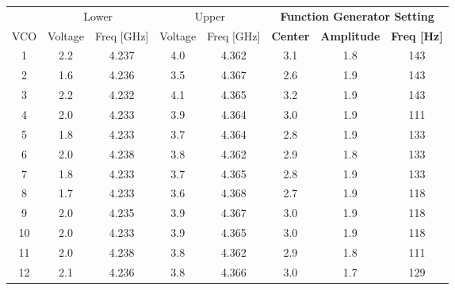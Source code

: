 \begin{table}[]
\centering
\begin{tabular}{@{}c|cc|cc|ccc@{}}
    & \multicolumn{2}{c|}{Lower} & \multicolumn{2}{c|}{Upper} & \multicolumn{3}{c}{\textbf{Function Generator Setting}}       \\
VCO & Voltage  & Freq {[}GHz{]}  & Voltage  & Freq {[}GHz{]}  & \textbf{Center} & \textbf{Amplitude} & \textbf{Freq {[}Hz{]}} \\ \midrule
1   & 2.2      & 4.237           & 4.0      & 4.362           & 3.1             & 1.8                & 143                    \\
2   & 1.6      & 4.236           & 3.5      & 4.367           & 2.6             & 1.9                & 143                    \\
3   & 2.2      & 4.232           & 4.1      & 4.365           & 3.2             & 1.9                & 143                    \\
4   & 2.0       & 4.233           & 3.9      & 4.364           & 3.0             & 1.9                & 111                    \\ \midrule
5   & 1.8      & 4.233           & 3.7      & 4.364           & 2.8             & 1.9                & 133                    \\
6   & 2.0      & 4.238           & 3.8      & 4.362           & 2.9             & 1.8                & 133                    \\
7   & 1.8      & 4.233           & 3.7      & 4.365           & 2.8             & 1.9                & 133                    \\
8   & 1.7      & 4.233           & 3.6      & 4.368           & 2.7             & 1.9                & 118                    \\ \midrule
9   & 2.0      & 4.235           & 3.9      & 4.367           & 3.0             & 1.9                & 118                    \\
10  & 2.0      & 4.233           & 3.9      & 4.365           & 3.0             & 1.9                & 118                    \\
11  & 2.0      & 4.238           & 3.8      & 4.362           & 2.9             & 1.8                & 111                    \\
12  & 2.1      & 4.236           & 3.8      & 4.366           & 3.0             & 1.7                & 129                    \\ \midrule

\end{tabular}
\end{table}
